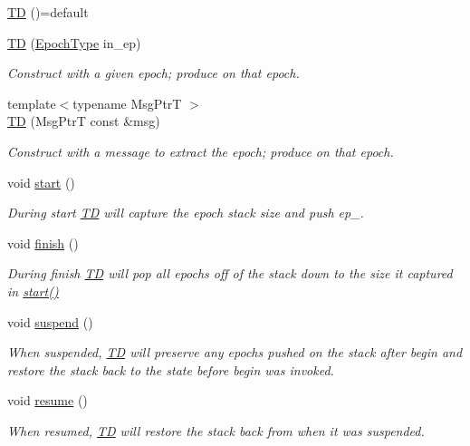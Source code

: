 \begin{DoxyCompactItemize}
\item 
\hyperlink{structvt_1_1ctx_1_1_t_d_a1cb75bb3a0803da9cc471b675aa9124e}{TD} ()=default
\item 
\hyperlink{structvt_1_1ctx_1_1_t_d_ade8d2b390d1b4a484dd9f5f20546bc91}{TD} (\hyperlink{namespacevt_a81d11b28122d43bf9834577e4a06440f}{Epoch\+Type} in\+\_\+ep)
\begin{DoxyCompactList}\small\item\em Construct with a given epoch; produce on that epoch. \end{DoxyCompactList}\item 
{\footnotesize template$<$typename Msg\+PtrT $>$ }\\\hyperlink{structvt_1_1ctx_1_1_t_d_a632c366417b95a168c345cfb17051eeb}{TD} (Msg\+PtrT const \&msg)
\begin{DoxyCompactList}\small\item\em Construct with a message to extract the epoch; produce on that epoch. \end{DoxyCompactList}\item 
void \hyperlink{structvt_1_1ctx_1_1_t_d_a648eebf5cd551a0917f7a304b03da05d}{start} ()
\begin{DoxyCompactList}\small\item\em During start {\ttfamily \hyperlink{structvt_1_1ctx_1_1_t_d}{TD}} will capture the epoch stack size and push {\ttfamily ep\+\_\+}. \end{DoxyCompactList}\item 
void \hyperlink{structvt_1_1ctx_1_1_t_d_a4c103ae125725848ad7af51e6c88144e}{finish} ()
\begin{DoxyCompactList}\small\item\em During finish {\ttfamily \hyperlink{structvt_1_1ctx_1_1_t_d}{TD}} will pop all epochs off of the stack down to the size it captured in {\ttfamily \hyperlink{structvt_1_1ctx_1_1_t_d_a648eebf5cd551a0917f7a304b03da05d}{start()}} \end{DoxyCompactList}\item 
void \hyperlink{structvt_1_1ctx_1_1_t_d_ab66a4c01265c0c43d95d0084ea8c5ff9}{suspend} ()
\begin{DoxyCompactList}\small\item\em When suspended, {\ttfamily \hyperlink{structvt_1_1ctx_1_1_t_d}{TD}} will preserve any epochs pushed on the stack after begin and restore the stack back to the state before begin was invoked. \end{DoxyCompactList}\item 
void \hyperlink{structvt_1_1ctx_1_1_t_d_a0092946ebad71b2518fa8fa5a7eeb3f2}{resume} ()
\begin{DoxyCompactList}\small\item\em When resumed, {\ttfamily \hyperlink{structvt_1_1ctx_1_1_t_d}{TD}} will restore the stack back from when it was suspended. \end{DoxyCompactList}\end{DoxyCompactItemize}
